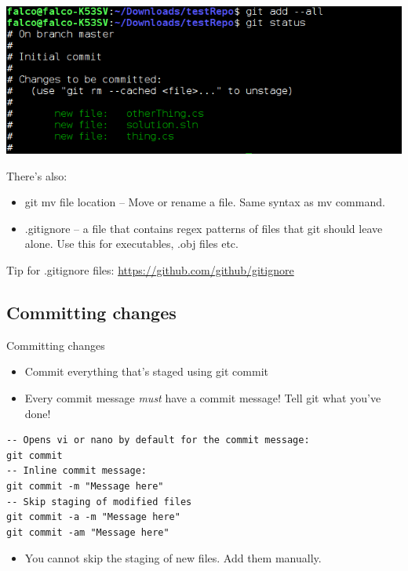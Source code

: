 \documentclass[10pt,a4paper]{beamer}
\begin{document}
\begin{frame}
\includegraphics[width=\linewidth]{gitaddall.png}
\end{frame}

\begin{frame}
There's also:
\begin{itemize}
\item git mv file location -- Move or rename a file. Same syntax as mv command.
\item .gitignore -- a file that contains regex patterns of files that git should leave alone. Use this for executables, .obj files etc.
\end{itemize}
Tip for .gitignore files:
\url{https://github.com/github/gitignore}
\end{frame}

\subsection{Committing changes}
\begin{frame}[fragile]{Committing changes}
\begin{itemize}
\item Commit everything that's staged using git commit
\item Every commit message \textit{must} have a commit message! Tell git what you've done!
\end{itemize}
\begin{verbatim}
-- Opens vi or nano by default for the commit message:
git commit
-- Inline commit message:
git commit -m "Message here"
-- Skip staging of modified files
git commit -a -m "Message here"
git commit -am "Message here"
\end{verbatim}
\begin{itemize}
\item You cannot skip the staging of new files. Add them manually.
\end{itemize}
\end{frame}
\end{document}
